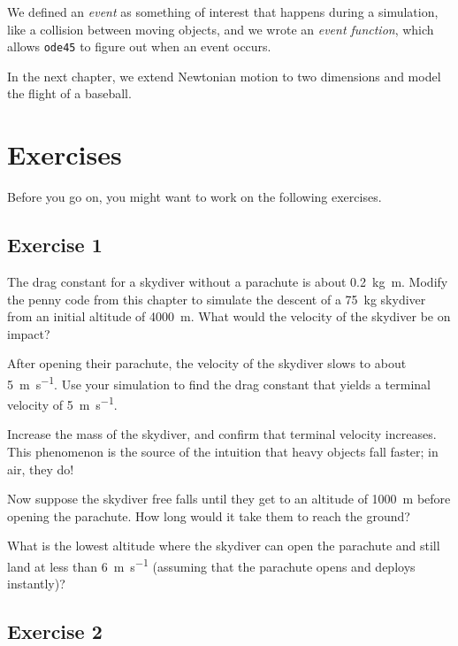 We defined an \emph{event} as something of interest that happens during a simulation, like a collision between moving objects, and we wrote an \emph{event function}, which allows \lstinline{ode45} to figure out when an event occurs.

In the next chapter, we extend Newtonian motion to two dimensions and model the flight of a baseball.


\section{Exercises}

Before you go on, you might want to work on the following exercises.

\subsection{Exercise 1}

The drag constant for a skydiver without a parachute is about \SI{0.2}{\kilogram \meter}.  Modify the penny code from this chapter to simulate the descent of a \SI{75}{\kilogram} skydiver from an initial altitude of \SI{4000}{\meter}.  What would the velocity of the skydiver be on impact?

After opening their parachute, the velocity of the skydiver slows to about \SI{5}{\meter\per\second}.  Use your simulation to find the drag constant that yields a terminal velocity of \SI{5}{\meter\per\second}.

Increase the mass of the skydiver, and confirm that terminal velocity increases.  This phenomenon is the source of the intuition that heavy objects fall faster; in air, they do!

Now suppose the skydiver free falls until they get to an altitude of \SI{1000}{\meter} before opening the parachute.  How long would it take them to reach the ground?

What is the lowest altitude where the skydiver can open the parachute and still land at less than \SI{6}{\meter\per\second} (assuming that the parachute opens and deploys instantly)?





\subsection{Exercise 2}
\label{earth}



